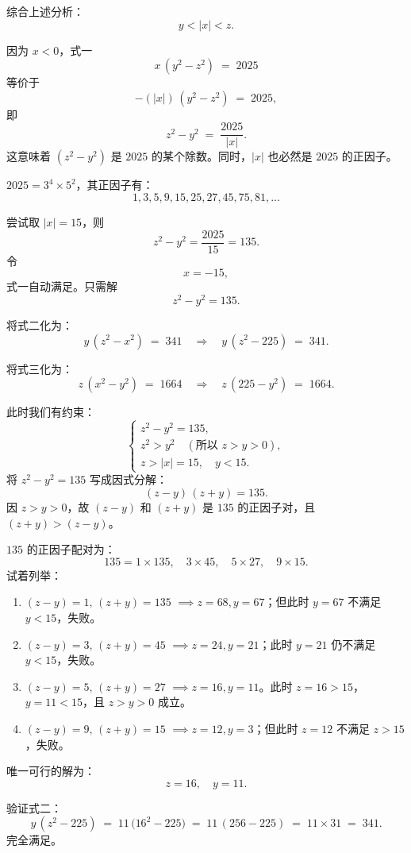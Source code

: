 \documentclass[12pt, a4paper]{article}
\theoremstyle{definition}
\theoremstyle{remark}
\begin{document}
\noindent 综合上述分析：
$$
y < |x| < z.
$$

\noindent 因为 \(x < 0\)，式一
$$
x\,(y^2 - z^2) \;=\; 2025
$$
等价于
$$
-(|x|)\,(y^2 - z^2) \;=\; 2025,
$$
即
$$
z^2 - y^2 \;=\;\frac{2025}{|x|}.
$$
这意味着 \((z^2 - y^2)\) 是 \(2025\) 的某个除数。同时，\(|x|\) 也必然是 \(2025\) 的正因子。

\noindent \(2025 = 3^4 \times 5^2\)，其正因子有：
$$
1, 3, 5, 9, 15, 25, 27, 45, 75, 81, \dots
$$

\noindent 尝试取 \(|x| = 15\)，则
$$
z^2 - y^2 = \frac{2025}{15} = 135.
$$
令
$$
x = -15,
$$
式一自动满足。只需解
$$
z^2 - y^2 = 135.
$$

\noindent 将式二化为：
$$
y\,(z^2 - x^2) \;=\; 341 
\quad\Longrightarrow\quad
y\,(z^2 - 225) \;=\; 341.
$$

\noindent 将式三化为：
$$
z\,(x^2 - y^2) \;=\; 1664
\quad\Longrightarrow\quad
z\,(225 - y^2) \;=\; 1664.
$$

\noindent 此时我们有约束：
$$
\begin{cases}
z^2 - y^2 = 135,\\[4pt]
z^2 > y^2\quad (\text{所以 } z > y > 0),\\[3pt]
z > |x| = 15,\quad y < 15.
\end{cases}
$$
将 \(z^2 - y^2 = 135\) 写成因式分解：
$$
(z-y)\,(z+y) = 135.
$$
因 \(z > y > 0\)，故 \((z-y)\) 和 \((z+y)\) 是 \(135\) 的正因子对，且 \((z+y) > (z-y)\)。

\noindent \(135\) 的正因子配对为：
$$
135 = 
1 \times 135, \quad 
3 \times 45, \quad
5 \times 27, \quad
9 \times 15.
$$
试着列举：
\begin{enumerate}
    \item \((z-y)=1,\,(z+y)=135\) \(\implies z=68,y=67\)；但此时 \(y=67\) 不满足 \(y < 15\)，失败。
    \item \((z-y)=3,\,(z+y)=45\) \(\implies z=24,y=21\)；此时 \(y=21\) 仍不满足 \(y < 15\)，失败。
    \item \((z-y)=5,\,(z+y)=27\) \(\implies z=16,y=11\)。此时 \(z=16 > 15\)，\(y=11 < 15\)，且 \(z > y > 0\) 成立。
    \item \((z-y)=9,\,(z+y)=15\) \(\implies z=12,y=3\)；但此时 \(z=12\) 不满足 \(z > 15\)，失败。
\end{enumerate}

\noindent 唯一可行的解为：
$$
z = 16, \quad y = 11.
$$

\noindent 验证式二：
$$
y\,(z^2 - 225) \;=\; 11\,\bigl(16^2 - 225\bigr)
\;=\; 11\,(256 - 225)
\;=\; 11 \times 31
\;=\; 341.
$$
完全满足。
\end{document}
